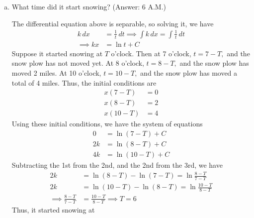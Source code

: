 \documentclass{article}
\begin{document}
\begin{enumerate}
\begin{enumerate}[(a)]
			\item What time did it start snowing? (Answer: 6 A.M.)
				\begin{soln}
					The differential equation above is separable, so solving it, we have
					\begin{align*}
						k\, dx &= \frac{1}{t}\, dt \implies \int k\, dx = \int \frac{1}{t}\, dt \\
						\implies kx &= \ln t + C
					\end{align*}
					Suppose it started snowing at $T$ o'clock. Then at 7 o'clock, $t=7-T,$ and the snow plow has not moved yet. At 8 o'clock, $t=8-T,$ and the snow plow has moved 2 miles. At 10 o'clock, $t=10-T,$ and the snow plow has moved a total of 4 miles. Thus, the initial conditions are
					\begin{align*}
						x(7-T) &= 0 \\
						x(8-T) &= 2 \\
						x(10-T) &= 4
					\end{align*}
					Using these initial conditions, we have the system of equations
					\begin{align*}
						0 &= \ln (7-T) + C \\
						2k &= \ln (8-T) + C \\
						4k &= \ln(10-T) + C
					\end{align*}
					Subtracting the 1st from the 2nd, and the 2nd from the 3rd, we have
					\begin{align*}
						2k &= \ln (8-T) - \ln (7-T) = \ln \frac{8-T}{7-T} \\
						2k &= \ln (10-T) - \ln(8-T) = \ln \frac{10-T}{8-T} \\
						\implies \frac{8-T}{7-T} &= \frac{10-T}{8-T} \implies T=6
					\end{align*}
					Thus, it started snowing at 
				\end{soln}

		\end{enumerate}


\end{enumerate}
\end{document}
